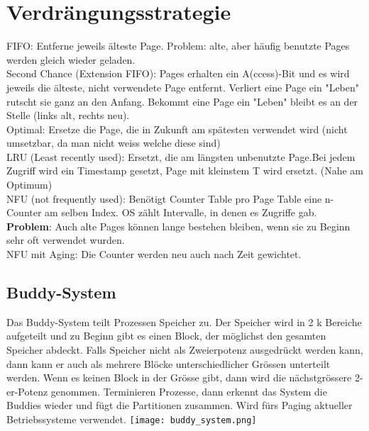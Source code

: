 \section{Verdrängungsstrategie}
\textcolor{myblue}{FIFO}: Entferne jeweils älteste Page. Problem: alte, aber häufig benutzte Pages werden gleich wieder geladen.\\
\textcolor{myblue}{Second Chance (Extension FIFO)}: Pages erhalten ein A(ccess)-Bit und es wird
jeweils die älteste, nicht verwendete Page entfernt. Verliert eine Page ein "Leben" rutscht sie ganz an den Anfang. Bekommt eine Page ein "Leben" bleibt es an der Stelle (links alt, rechts neu).\\
\textcolor{myblue}{Optimal}: Ersetze die Page, die in Zukunft am spätesten verwendet wird (nicht umsetzbar, da man nicht weiss welche diese sind)\\
\textcolor{myblue}{LRU (Least recently used)}: Ersetzt, die am längsten unbenutzte Page.Bei jedem Zugriff wird ein Timestamp gesetzt, Page mit kleinstem T wird ersetzt. (Nahe am Optimum)\\
\textcolor{myblue}{NFU (not frequently used)}: Benötigt Counter Table pro Page Table eine n-Counter am selben Index. OS zählt Intervalle, in denen es Zugriffe gab.\\
\textbf{Problem}: Auch alte Pages können lange bestehen bleiben, wenn sie zu Beginn sehr oft verwendet wurden.\\
\textcolor{myblue}{NFU mit Aging}: Die Counter werden neu auch nach Zeit gewichtet.
\subsection{Buddy-System}
Das Buddy-System teilt Prozessen Speicher zu. Der Speicher wird in 2 k Bereiche aufgeteilt und zu Beginn gibt es einen Block, der möglichst den gesamten Speicher abdeckt. Falls Speicher nicht als Zweierpotenz ausgedrückt werden kann, dann kann er auch als mehrere Blöcke unterschiedlicher Grössen unterteilt werden. Wenn es keinen Block in der Grösse gibt, dann wird die nächstgrössere 2-er-Potenz genommen. Terminieren Prozesse, dann erkennt das System die Buddies wieder und fügt die Partitionen zusammen. Wird fürs Paging aktueller Betriebssysteme verwendet.
\texttt{[image: buddy\_system.png]}

